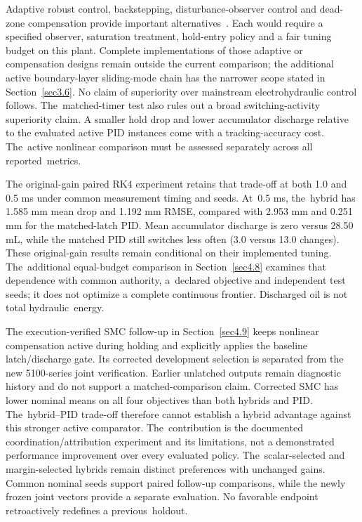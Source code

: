 \documentclass[machines,article,submit,pdftex,moreauthors]{Definitions/mdpi}
\begin{document}
Adaptive robust control, backstepping, disturbance-observer control and dead-zone compensation provide important alternatives~\cite{yao2000,guan2008,choux2010,deng2017,chen2016}. Each would require a specified observer, saturation treatment, hold-entry policy and a fair tuning budget on this plant. Complete implementations of those adaptive or compensation designs remain outside the current comparison; the additional active boundary-layer sliding-mode chain has the narrower scope stated in Section~\ref{sec3.6}. No claim of superiority over mainstream electrohydraulic control follows. The~matched-timer test also rules out a broad switching-activity superiority claim. A smaller hold drop and lower accumulator discharge relative to the evaluated active PID instances come with a tracking-accuracy cost. The~active nonlinear comparison must be assessed separately across all reported~metrics.

The original-gain paired RK4 experiment retains that trade-off at both 1.0 and 0.5 ms under common measurement timing and seeds. At~0.5 ms, the~hybrid has 1.585 mm mean drop and 1.192 mm RMSE, compared with 2.953 mm and 0.251 mm for the matched-latch PID. Mean accumulator discharge is zero versus 28.50 mL, while the matched PID still switches less often (3.0 versus 13.0 changes). These original-gain results remain conditional on their implemented tuning. The~additional equal-budget comparison in Section~\ref{sec4.8} examines that dependence with common authority, a~declared objective and independent test seeds; it does not optimize a complete continuous frontier. Discharged oil is not total hydraulic~energy.

The execution-verified SMC follow-up in Section~\ref{sec4.9} keeps nonlinear compensation active during holding and explicitly applies the baseline latch/discharge gate. Its corrected development selection is separated from the new 5100-series joint verification. Earlier unlatched outputs remain diagnostic history and do not support a matched-comparison claim. Corrected SMC has lower nominal means on all four objectives than both hybrids and PID. The~hybrid--PID trade-off therefore cannot establish a hybrid advantage against this stronger active comparator. The~contribution is the documented coordination/attribution experiment and its limitations, not a demonstrated performance improvement over every evaluated policy. The~scalar-selected and margin-selected hybrids remain distinct preferences with unchanged gains. Common nominal seeds support paired follow-up comparisons, while the newly frozen joint vectors provide a separate evaluation. No favorable endpoint retroactively redefines a previous~holdout.
\end{document}
